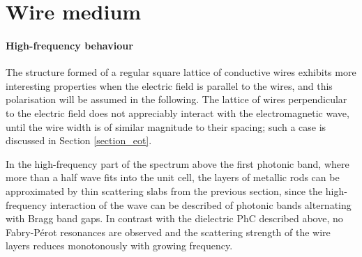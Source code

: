 
\FloatBarrier %
\section{Wire medium} \label{chap_wiremedium}%
\paragraph{High-frequency behaviour}%
The structure formed of a regular square lattice of conductive wires exhibits more interesting properties when the electric field is parallel to the wires, and this polarisation will be assumed in the following. The lattice of wires perpendicular to the electric field does not appreciably interact with the electromagnetic wave, until the wire width is of similar magnitude to their spacing; such a case is discussed in Section \ref{section_eot}.

In the high-frequency part of the spectrum above the first photonic band, where more than a half wave fits into the unit cell, the layers of metallic rods can be approximated by thin scattering slabs from the previous section, since the high-frequency interaction of the wave can be described of photonic bands alternating with Bragg band gaps. In contrast with the dielectric PhC described above, no Fabry-Pérot resonances are observed and the scattering strength of the wire layers reduces monotonously with growing frequency.


